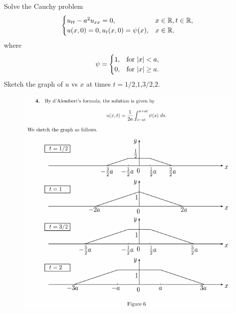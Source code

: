 \begin{question}{5.4}{}
    Solve the Cauchy problem
    \[
        \begin{cases}
            u_{tt} - a^2u_{xx} = 0, & x\in\mathbb{R}, t\in\mathbb{R}, \\
            u(x,0)=0, u_t(x,0)=\psi(x), & x\in\mathbb{R}, \\
        \end{cases}
    \]
    where
    \[
        \psi = \begin{cases}
            1, & \text{for $\abs{x}<a$}, \\
            0, & \text{for $\abs{x}\geq a$}. \\
        \end{cases}
    \]
    Sketch the graph of $u$ vs $x$ at times $t=1/2$,$1$,$3/2$,$2$.
\end{question}
\begin{figure}[H]
    \includegraphics[width=.9\textwidth]{figures/5.4-1.png}
\end{figure}


